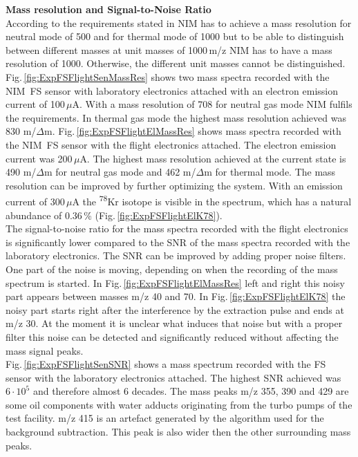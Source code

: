 		\textbf{Mass resolution and Signal-to-Noise Ratio}\\
		According to the requirements stated in \cite{red_book} NIM has to achieve a mass resolution for neutral mode of 500 and for thermal mode of 1000 but to be able to distinguish between different masses at unit masses of 1000\,m/z NIM has to have a mass resolution of 1000. Otherwise, the different unit masses cannot be distinguished.\\
		Fig.\,\ref{fig:ExpFSFlightSenMassRes} shows two mass spectra recorded with the NIM~FS sensor with laboratory electronics attached with an electron emission current of 100\,$\mu$A. With a mass resolution of 708 for neutral gas mode NIM fulfils the requirements. In thermal gas mode the highest mass resolution achieved was 830 m/$\Delta$m. Fig.\,\ref{fig:ExpFSFlightElMassRes} shows mass spectra recorded with the NIM~FS sensor with the flight electronics attached. The electron emission current was 200\,$\mu$A. The highest mass resolution achieved at the current state is 490 m/$\Delta$m for neutral gas mode and 462 m/$\Delta$m for thermal mode. The mass resolution can be improved by further optimizing the system. With an emission current of 300\,$\mu$A the \textsuperscript{78}Kr isotope is visible in the spectrum, which has a natural abundance of 0.36\,\% (Fig.\,\ref{fig:ExpFSFlightElK78}).\\
		The signal-to-noise ratio for the mass spectra recorded with the flight electronics is significantly lower compared to the SNR of the mass spectra recorded with the laboratory electronics. The SNR can be improved by adding proper noise filters. One part of the noise is moving, depending on when the recording of the mass spectrum is started. In Fig.\,\ref{fig:ExpFSFlightElMassRes} left and right this noisy part appears between masses m/z 40 and 70. In Fig.\,\ref{fig:ExpFSFlightElK78} the noisy part starts right after the interference by the extraction pulse and ends at m/z 30. At the moment it is unclear what induces that noise but with a proper filter this noise can be detected and significantly reduced without affecting the mass signal peaks.\\
		Fig.\,\ref{fig:ExpFSFlightSenSNR} shows a mass spectrum recorded with the FS sensor with the laboratory electronics attached. The highest SNR achieved was $6\cdot10^{5}$ and therefore almost 6 decades. The mass peaks m/z 355, 390 and 429 are some oil components with water adducts originating from the turbo pumps of the test facility. m/z 415 is an artefact generated by the algorithm used for the background subtraction. This peak is also wider then the other surrounding mass peaks.
